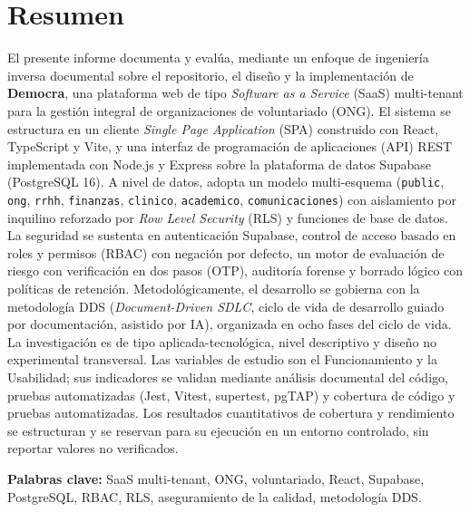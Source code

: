 \chapter*{Resumen}
El presente informe documenta y eval\'ua, mediante un enfoque de ingenier\'ia inversa documental sobre
el repositorio, el dise\~no y la implementaci\'on de \textbf{Democra}, una plataforma web de tipo
\textit{Software as a Service} (SaaS) multi-tenant para la gesti\'on integral de organizaciones de
voluntariado (ONG). El sistema se estructura en un cliente \textit{Single Page Application} (SPA)
construido con React, TypeScript y Vite, y una interfaz de programaci\'on de aplicaciones (API) REST
implementada con Node.js y Express sobre la plataforma de datos Supabase (PostgreSQL 16). A nivel de
datos, adopta un modelo multi-esquema (\texttt{public}, \texttt{ong}, \texttt{rrhh},
\texttt{finanzas}, \texttt{clinico}, \texttt{academico}, \texttt{comunicaciones}) con aislamiento
por inquilino reforzado por \textit{Row Level Security} (RLS) y funciones de base de datos. La
seguridad se sustenta en autenticaci\'on Supabase, control de acceso basado en roles y permisos (RBAC)
con negaci\'on por defecto, un motor de evaluaci\'on de riesgo con verificaci\'on en dos pasos (OTP),
auditor\'ia forense y borrado l\'ogico con pol\'iticas de retenci\'on. Metodol\'ogicamente, el desarrollo se
gobierna con la metodolog\'ia DDS (\textit{Document-Driven SDLC}, ciclo de vida de desarrollo guiado por documentaci\'on, asistido por IA), organizada en
ocho fases del ciclo de vida. La investigaci\'on es de tipo aplicada-tecnol\'ogica, nivel descriptivo y
dise\~no no experimental transversal. Las variables de estudio son el Funcionamiento y la Usabilidad;
sus indicadores se validan mediante an\'alisis documental del c\'odigo, pruebas automatizadas (Jest,
Vitest, supertest, pgTAP) y cobertura de c\'odigo y pruebas automatizadas. Los resultados cuantitativos
de cobertura y rendimiento se estructuran y se reservan para su ejecuci\'on en un entorno
controlado, sin reportar valores no verificados.

\vspace{0.3cm}
\noindent\textbf{Palabras clave:} SaaS multi-tenant, ONG, voluntariado, React, Supabase, PostgreSQL,
RBAC, RLS, aseguramiento de la calidad, metodolog\'ia DDS.
